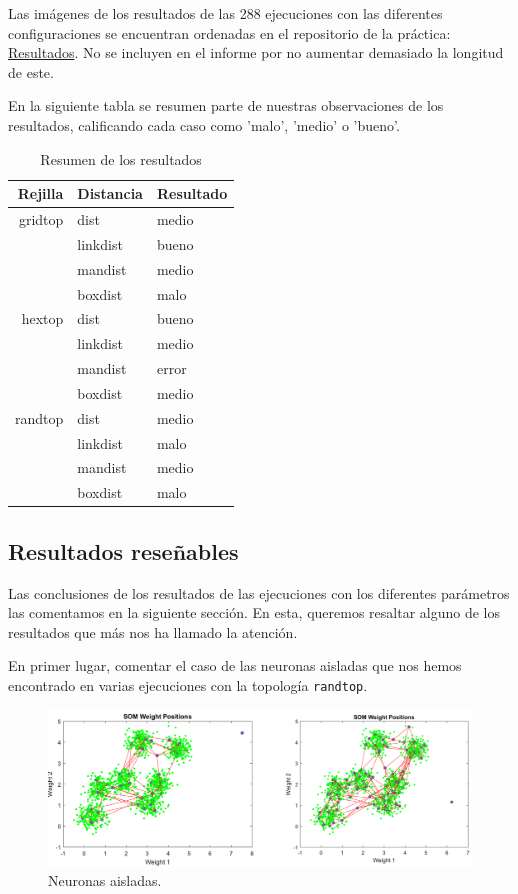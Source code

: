 \documentclass[a4paper,12pt,titlepage]{article}
\begin{document}
Las imágenes de los resultados de las 288 ejecuciones con las diferentes configuraciones se encuentran ordenadas en el repositorio de la práctica: \href{https://github.com/davidmigloz/neuronal-networks/tree/master/P2\_SelfOrganizingMap/img}{Resultados}. No se incluyen en el informe por no aumentar demasiado la longitud de este.

En la siguiente tabla se resumen parte de nuestras observaciones de los resultados, calificando cada caso como 'malo', 'medio' o 'bueno'.

\begin{table}[!ht]
\centering
\begin{tabular}{r l l}
\toprule
Rejilla & Distancia & Resultado \\ 
\midrule
gridtop & dist & medio \\ 
        & linkdist & bueno \\ 
        & mandist & medio \\ 
	      & boxdist & malo \\ 
hextop & dist & bueno \\ 
       & linkdist & medio \\ 
	     & mandist & error \\ 
			 & boxdist & medio \\ 
randtop & dist & medio \\ 
   	 	  & linkdist & malo \\ 
				& mandist & medio \\ 
				& boxdist & malo \\ 
\bottomrule
\end{tabular} 
\caption{Resumen de los resultados}
\label{tab:results}
\end{table}

\subsection{Resultados reseñables}

Las conclusiones de los resultados de las ejecuciones con los diferentes parámetros las comentamos en la siguiente sección. En esta, queremos resaltar alguno de los resultados que más nos ha llamado la atención.

En primer lugar, comentar el caso de las neuronas aisladas que nos hemos encontrado en varias ejecuciones con la topología \lstinline|randtop|.

\begin{figure}[!ht]
	\centering
	\label{fig:neuronas-aisladas}
	\includegraphics[width=\textwidth]{neuronas-aisladas.png}
	\caption{Neuronas aisladas.}
\end{figure}
\end{document}
